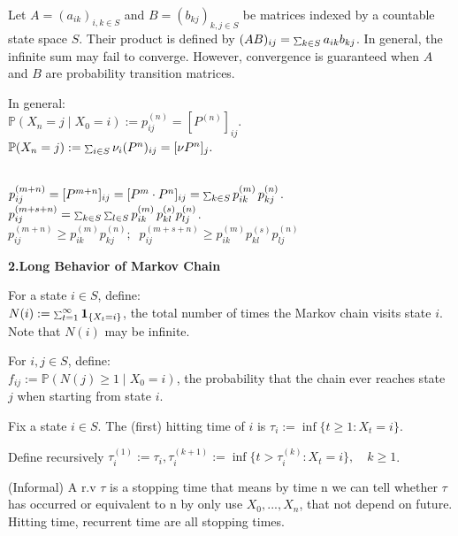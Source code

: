 \documentclass[a4paper, landscape]{article}
\newcommand{\topic}[1]{\par\medskip\textbf{#1}\par}
\newcommand{\subtopic}[1]{\par\textbf{#1}}
\newcommand{\smallsum}{\mathop{\scalebox{0.65}{$\sum$}}\nolimits}
\renewcommand{\topic}[1]{\par\medskip\noindent\colorbox{highlightcolor}{\parbox{\dimexpr\columnwidth-2\fboxsep\relax}{\textbf{#1}}}\par}
\renewcommand{\subtopic}[1]{\par\textbf{\color{blue}{#1}}} %
\begin{document}
\begin{multicols}{4}
\subtopic{Infinite-dimensional matrices}
Let $A=(a_{ik})_{i,k\in S}$ and $B=(b_{kj})_{k,j\in S}$ be matrices indexed by a
countable state space $S$.
Their product is defined by
$(AB)_{ij} = \smallsum_{k\in S} a_{ik} b_{kj}$.
In general, the infinite sum may fail to converge.
However, convergence is guaranteed when $A$ and $B$ are
probability transition matrices.

\subtopic{$n$-step transition probabilities} In general:\\
$\mathbb P(X_n=j \mid X_0=i):=p^{(n)}_{ij}=[P^{(n)}]_{ij}.$\\
$\mathbb P(X_n=j):=\smallsum_{i\in S}\nu_i (P^{n})_{ij} = [\nu P^n]_{j}.$
\subtopic{Chapman--Kolmogorov equations}\\ 
$p^{(m+n)}_{ij}=
[P^{m+n}]_{ij}=
[P^m\cdot P^n]_{ij}=
\smallsum_{k\in S} p^{(m)}_{ik}\, p^{(n)}_{kj}$.\\
$p^{(m+s+n)}_{ij}=
\smallsum_{k\in S}\smallsum_{l\in S} p^{(m)}_{ik}\, p^{(s)}_{kl}p^{(n)}_{lj}$.\\
$p^{(m+n)}_{ij}\geq p^{(m)}_{ik}p^{(n)}_{kj};\;\; p^{(m+s+n)}_{ij}\geq p^{(m)}_{ik}p^{(s)}_{kl}p^{(n)}_{lj}$

\topic{2.Long Behavior of Markov Chain}
\subtopic{Number of visits} For a state $i\in S$, define:\\
$N(i):=\smallsum_{t=1}^{\infty} \mathbf{1}_{\{X_t=i\}}$,
the total number of times the Markov chain visits state $i$.
Note that $N(i)$ may be infinite.

\subtopic{Hitting probability} For $i,j\in S$, define:\\
$f_{ij}:=\mathbb P(N(j)\ge1 \mid X_0=i)$, the probability that the chain ever reaches state $j$ when starting from state $i$.

\subtopic{Hitting time} Fix a state $i\in S$. The (first) hitting time of $i$ is
$\tau_i := \inf\{t\ge 1 : X_t=i\}$.

\subtopic{k-th Hitting time} Define recursively
$\tau_i^{(1)} := \tau_i, 
\tau_i^{(k+1)} := \inf\{t>\tau_i^{(k)} : X_t=i\},
\quad k\ge1$.

\subtopic{Stopping time}(Informal) A r.v $\tau$ is a stopping time that means by time n we can tell whether $\tau$ has occurred or equivalent to n by only use $X_0,...,X_n$, that not depend on future.\\
Hitting time, recurrent time are all stopping times.


\end{multicols}
\end{document}
